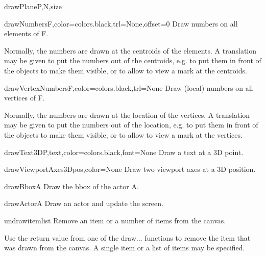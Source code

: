 \begin{funcdesc}{drawPlane}{P,N,size}
\end{funcdesc}

\begin{funcdesc}{drawNumbers}{F,color=colors.black,trl=None,offset=0}
Draw numbers on all elements of F.

Normally, the numbers are drawn at the centroids of the elements.
A translation may be given to put the numbers out of the centroids,
e.g. to put them in front of the objects to make them visible,
or to allow to view a mark at the centroids.

\end{funcdesc}

\begin{funcdesc}{drawVertexNumbers}{F,color=colors.black,trl=None}
Draw (local) numbers on all vertices of F.

Normally, the numbers are drawn at the location of the vertices.
A translation may be given to put the numbers out of the location,
e.g. to put them in front of the objects to make them visible,
or to allow to view a mark at the vertices.

\end{funcdesc}

\begin{funcdesc}{drawText3D}{P,text,color=colors.black,font=None}
Draw a text at a 3D point.
\end{funcdesc}

\begin{funcdesc}{drawViewportAxes3D}{pos,color=None}
Draw two viewport axes at a 3D position.
\end{funcdesc}

\begin{funcdesc}{drawBbox}{A}
Draw the bbox of the actor A.
\end{funcdesc}

\begin{funcdesc}{drawActor}{A}
Draw an actor and update the screen.
\end{funcdesc}

\begin{funcdesc}{undraw}{itemlist}
Remove an item or a number of items from the canvas.

Use the return value from one of the draw... functions to remove
the item that was drawn from the canvas.
A single item or a list of items may be specified.

\end{funcdesc}


